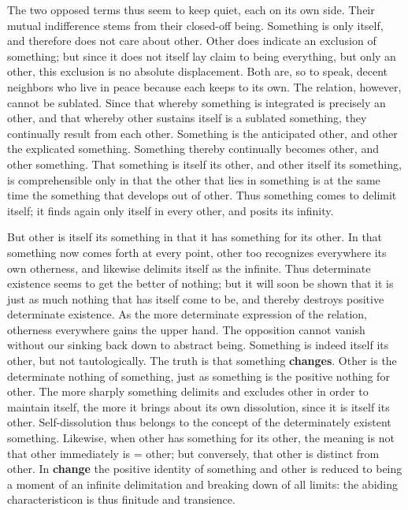 \documentclass[12pt,a4paper,openany]{book}
\newcommand{\opage}[1]{\marginnote{\footnotesize\textit{[#1]}}}
\begin{document}
The two opposed terms thus seem to keep
quiet, each on its own side. Their mutual indifference
stems from their closed-off being. Something is
only itself, and therefore does not care about other. Other
does indicate an exclusion of something; but since it
does not itself lay claim to being everything, but only an
other, this exclusion is no absolute
\setcounter{footnote}{0}%
\opage{12}displacement. Both are, so to speak, decent neighbors who
live in peace because each keeps to its own. The relation,
however, cannot be sublated. Since that whereby something is integrated is precisely an other,
and that whereby other sustains itself is a sublated something, they continually result from each other. Something
is the anticipated other, and other the explicated something.
Something thereby continually becomes other, and other
something. That something is itself its other, and other itself
its something, is comprehensible only in that the other
that lies in something is at the same time the something that develops
out of other. Thus something comes to delimit
itself; it finds again only itself in every other, and
posits its infinity.

But other is itself its something in that it has
something for its other. In that something now comes forth
at every point, other too recognizes everywhere its
own otherness, and likewise delimits itself as
the infinite. Thus determinate existence seems to get
the better of nothing; but it will soon be shown that it is
just as much nothing that has itself come to be, and thereby
destroys positive determinate existence. As the more determinate
expression of the relation, otherness everywhere gains the upper hand.
The opposition cannot vanish without our
sinking back down to abstract being. Something is indeed
itself its other, but not tautologically. The truth is that
something \textbf{changes}. Other is the determinate nothing
of something, just as something is the positive nothing for other.
The more sharply something delimits and excludes other in order
to maintain itself, the more it brings about its
own dissolution, since it is itself its other. Self-dissolution thus belongs to the concept of the determinately existent
something. Likewise, when other has something for its
other, the meaning is not that other immediately is
\setcounter{footnote}{0}%
\opage{13}= other; but conversely, that other is distinct from other.
In \textbf{change} the positive identity
of something and other is reduced to being a moment of an
infinite delimitation and breaking down of all limits:
the abiding characteristicon is thus finitude
and transience.
\end{document}
